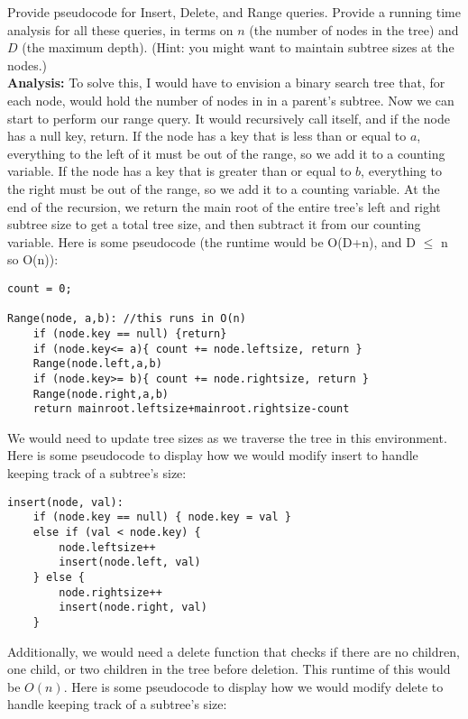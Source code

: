 \documentclass[a4paper,12pt]{article}
\begin{document}
Provide pseudocode for Insert, Delete, and Range queries. Provide a running time analysis for all these queries, in terms on $n$ (the number of nodes in the tree) and $D$ (the maximum depth). (Hint: you might want to maintain subtree sizes at the nodes.)\\

\textbf{Analysis:} To solve this, I would have to envision a binary search tree that, for each node, would hold the number of nodes in in a parent's subtree. Now we can start to perform our range query. It would recursively call itself, and if the node has a null key, return. If the node has a key that is less than or equal to $a$, everything to the left of it must be out of the range, so we add it to a counting variable. If the node has a key that is greater than or equal to $b$, everything to the right must be out of the range, so we add it to a counting variable. At the end of the recursion, we return the main root of the entire tree's left and right subtree size to get a total tree size, and then subtract it from our counting variable. Here is some pseudocode (the runtime would be O(D+n), and D $\leq$ n so O(n)):\\

\begin{verbatim}
count = 0;

Range(node, a,b): //this runs in O(n)
    if (node.key == null) {return}
    if (node.key<= a){ count += node.leftsize, return }
    Range(node.left,a,b)
    if (node.key>= b){ count += node.rightsize, return }
    Range(node.right,a,b)
    return mainroot.leftsize+mainroot.rightsize-count
\end{verbatim}

We would need to update tree sizes as we traverse the tree in this environment. Here is some pseudocode to display how we would modify insert to handle keeping track of a subtree's size: \\

\begin{verbatim}
insert(node, val):
    if (node.key == null) { node.key = val }
    else if (val < node.key) {
        node.leftsize++
        insert(node.left, val)    
    } else {
        node.rightsize++
        insert(node.right, val)
    }
\end{verbatim}

Additionally, we would need a delete function that checks if there are no children, one child, or two children in the tree before deletion. This runtime of this would be $O(n)$. Here is some pseudocode to display how we would modify delete to handle keeping track of a subtree's size: \\
\end{document}
